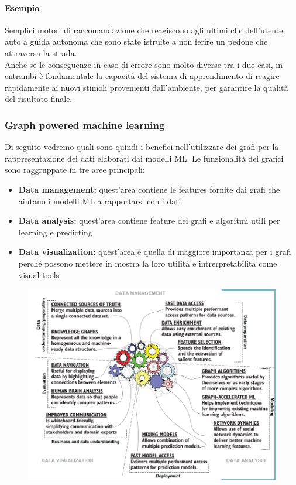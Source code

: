 \paragraph{Esempio} Semplici motori di raccomandazione che reagiscono agli ultimi clic dell’utente; auto a guida autonoma che sono state istruite a non ferire un pedone che attraversa la strada.
\\
Anche se le conseguenze in caso di errore sono molto diverse tra i due casi, in entrambi è fondamentale la capacità del sistema di apprendimento di reagire rapidamente ai nuovi stimoli provenienti dall’ambiente, per garantire la qualità del risultato finale.

\subsubsection*{Graph powered machine learning}
Di seguito vedremo quali sono quindi i benefici nell'utilizzare dei grafi per la rappresentazione dei dati elaborati dai modelli ML. Le funzionalità dei grafici sono raggruppate in tre aree principali:
\begin{itemize}
    \item \textbf{Data management:} quest'area contiene le features fornite dai grafi che aiutano i modelli ML a rapportarsi con i dati
    \item \textbf{Data analysis:} quest'area contiene feature dei grafi e algoritmi utili per learning e predicting
    \item \textbf{Data visualization:} quest'area é quella di maggiore importanza per i grafi perché possono mettere in mostra la loro utilitá e intrerpretabilitá come visual tools
\end{itemize}
\begin{figure}[th]
    \centering
    \includegraphics[width=0.65\linewidth]{ML&Graphs//img/treD.png}
\end{figure}

